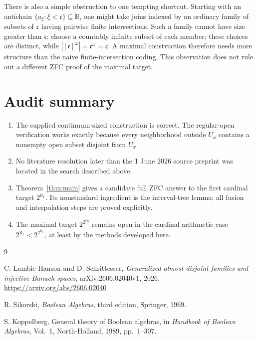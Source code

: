 \documentclass[11pt]{article}
\theoremstyle{definition}
\theoremstyle{remark}
\newcommand{\B}{\mathbb B}
\begin{document}
There is also a simple obstruction to one tempting shortcut.  Starting with an
antichain \(\{a_\xi:\xi<\mathfrak c\}\subseteq\B\), one might take joins
indexed by an ordinary family of subsets of \(\mathfrak c\) having pairwise
finite intersections.  Such a family cannot have size greater than
\(\mathfrak c\): choose a countably infinite subset of each member; these
choices are distinct, while
\(|[\mathfrak c]^\omega|=\mathfrak c^\omega=\mathfrak c\).  A maximal
construction therefore needs more structure than the naive finite-intersection
coding.  This observation does not rule out a different ZFC proof of the
maximal target.

\section{Audit summary}

\begin{enumerate}[leftmargin=2.2em]
\item The supplied continuum-sized construction is correct.  The regular-open
      verification works exactly because every neighborhood outside \(U_x\)
      contains a nonempty open subset disjoint from \(U_x\).
\item No literature resolution later than the 1 June 2026 source preprint was
      located in the search described above.
\item Theorem~\ref{thm:main} gives a candidate full ZFC answer to the first
      cardinal target \(2^{\aleph_1}\).  Its nonstandard ingredient is the
      interval-tree lemma; all fusion and interpolation steps are proved
      explicitly.
\item The maximal target \(2^{2^{\aleph_0}}\) remains open in the cardinal
      arithmetic case \(2^{\aleph_1}<2^{2^{\aleph_0}}\), at least by the
      methods developed here.
\end{enumerate}

\begin{thebibliography}{9}

C. Lambie-Hanson and D. Schrittesser,
\emph{Generalized almost disjoint families and injective Banach spaces},
arXiv:2606.02040v1, 2026.
\url{https://arxiv.org/abs/2606.02040}

R. Sikorski,
\emph{Boolean Algebras}, third edition,
Springer, 1969.

S. Koppelberg,
General theory of Boolean algebras,
in \emph{Handbook of Boolean Algebras}, Vol.~1,
North-Holland, 1989, pp.~1--307.

\end{thebibliography}
\end{document}
